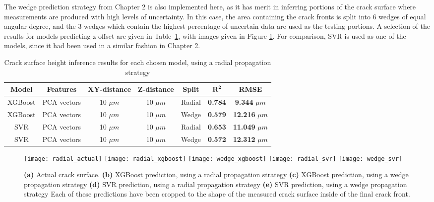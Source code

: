 The wedge prediction strategy from Chapter 2 is also implemented here, as it has merit in inferring portions of the crack surface where measurements are produced with high levels of uncertainty.  In this case, the area containing the crack fronts is split into $6$ wedges of equal angular degree, and the 3 wedges which contain the highest percentage of uncertain data are used as the testing portions.  A selection of the results for models predicting z-offset are given in Table~\ref{table:radial-comparison}, with images given in Figure \ref{fig:radial_predictions}.  For comparison, SVR is used as one of the models, since it had been used in a similar fashion in Chapter 2.

\begin{table}[b]
  \centering
  \caption{Crack surface height inference results for each chosen model, using a radial propagation strategy}
  \label{table:radial-comparison}
  \begin{tabular}{| c | c | c | c | c | c | c |} \hline
    \textbf{Model} & \textbf{Features} & \textbf{XY-distance} & \textbf{Z-distance} & \textbf{Split}  & $\bm{R^2}$     & \textbf{RMSE}           \\ \hline
    XGBoost        & PCA vectors       & 10 $\mu m$           & 10 $\mu m$          & Radial          & \textbf{0.784} & \textbf{9.344}  $\mu m$ \\ \hline
    XGBoost        & PCA vectors       & 10 $\mu m$           & 10 $\mu m$          & Wedge           & \textbf{0.579} & \textbf{12.216} $\mu m$ \\ \hline
    SVR            & PCA vectors       & 10 $\mu m$           & 10 $\mu m$          & Radial          & \textbf{0.653} & \textbf{11.049} $\mu m$ \\ \hline
    SVR            & PCA vectors       & 10 $\mu m$           & 10 $\mu m$          & Wedge           & \textbf{0.572} & \textbf{12.312} $\mu m$ \\ \hline
  \end{tabular}
\end{table}

\begin{figure}[b]
  \centering
    \texttt{[image: radial\_actual]}
    \texttt{[image: radial\_xgboost]}
    \texttt{[image: wedge\_xgboost]}
    \texttt{[image: radial\_svr]}
    \texttt{[image: wedge\_svr]}
    \caption{\textbf{(a)}  Actual crack surface.
             \textbf{(b)} XGBoost prediction, using a radial propagation strategy
             \textbf{(c)} XGBoost prediction, using a wedge propagation strategy
             \textbf{(d)} SVR prediction, using a radial propagation strategy
             \textbf{(e)} SVR prediction, using a wedge propagation strategy
             Each of these predictions have been cropped to the shape of the measured crack surface inside of the final crack front. }
  \label{fig:radial_predictions}
\end{figure}

